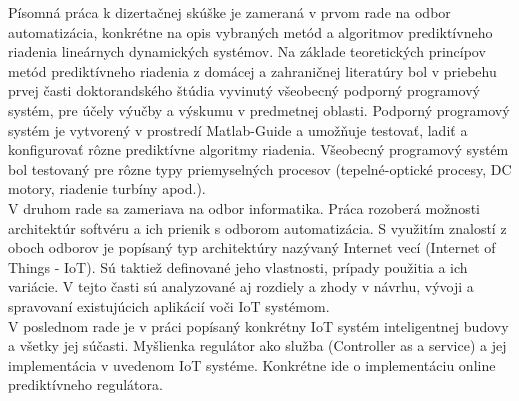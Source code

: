 Písomná práca k dizertačnej skúške je zameraná v prvom rade na odbor automatizácia, konkrétne na opis vybraných metód a algoritmov prediktívneho riadenia lineárnych dynamických systémov. Na základe teoretických princípov metód prediktívneho riadenia z domácej a zahraničnej literatúry bol v priebehu prvej časti doktorandského štúdia vyvinutý všeobecný podporný programový systém, pre účely výučby a výskumu v predmetnej oblasti.  Podporný programový systém je vytvorený v prostredí Matlab-Guide a umožňuje testovať, ladiť a konfigurovať rôzne prediktívne algoritmy riadenia. Všeobecný programový systém bol testovaný pre rôzne typy priemyselných procesov (tepelné-optické procesy, DC motory, riadenie turbíny apod.).\\
\indent V druhom rade sa zameriava na odbor informatika. Práca rozoberá možnosti architektúr softvéru a ich prienik s odborom automatizácia. S využitím znalostí z oboch odborov je popísaný typ architektúry nazývaný Internet vecí (Internet of Things - IoT). Sú taktiež definované jeho vlastnosti, prípady použitia a ich variácie. V tejto časti sú analyzované aj rozdiely a zhody v návrhu, vývoji a spravovaní existujúcich aplikácií voči IoT systémom.\\
\indent V poslednom rade je v práci popísaný konkrétny IoT systém inteligentnej budovy a všetky jej súčasti. Myšlienka regulátor ako služba (Controller as a service) a jej implementácia v uvedenom IoT systéme. Konkrétne ide o implementáciu online prediktívneho regulátora.